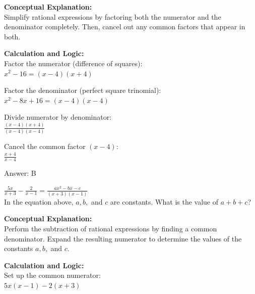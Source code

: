 \documentclass[11pt,paper=a4,answers]{exam}
\begin{document}
\begin{questions}
\begin{solution}
\textbf{Conceptual Explanation:} \\
Simplify rational expressions by factoring both the numerator and the denominator completely. Then, cancel out any common factors that appear in both.

\vspace{20pt}

\textbf{Calculation and Logic:} \\
Factor the numerator (difference of squares): \\
$x^2 - 16 = (x-4)(x+4)$

\vspace{10pt}

Factor the denominator (perfect square trinomial): \\
$x^2 - 8x + 16 = (x-4)(x-4)$

\vspace{10pt}

Divide numerator by denominator: \\
$\frac{(x-4)(x+4)}{(x-4)(x-4)}$

\vspace{10pt}

Cancel the common factor $(x-4)$: \\
$\frac{x+4}{x-4}$

\vspace{25pt}

Answer: \colorbox{yellow!100}{B}
\end{solution}

\vspace{40pt}

\question
$\frac{5x}{x+3} - \frac{2}{x-1} = \frac{ax^2 - bx - c}{(x+3)(x-1)}$ \\
In the equation above, $a, b,$ and $c$ are constants. What is the value of $a + b + c$?

\begin{solution}
\textbf{Conceptual Explanation:} \\
Perform the subtraction of rational expressions by finding a common denominator. Expand the resulting numerator to determine the values of the constants $a, b,$ and $c$.

\vspace{20pt}

\textbf{Calculation and Logic:} \\
Set up the common numerator: \\
$5x(x-1) - 2(x+3)$


\end{solution}
\end{questions}
\end{document}
